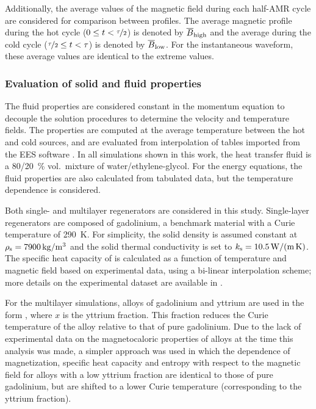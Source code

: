 \documentclass[referee]{svjour3}
\begin{document}

Additionally, the average values of the magnetic field during each half-AMR cycle are considered for comparison between profiles. The average magnetic profile during the hot cycle ($0 \le t < \nicefrac{\tau}{2}$) is denoted by $\overline{B}_{\mathrm{high}}$ and the average during the cold cycle  ($ \nicefrac{\tau}{2} \le t < \tau$) is denoted by $\overline{B}_{\mathrm{low}}$. For the instantaneous waveform, these average values are identical to the extreme values.


\subsubsection{Evaluation of solid and fluid properties}
\label{sec:eval-solid-fluid}

The fluid properties are considered constant in the momentum equation to decouple the solution procedures to determine the velocity and temperature fields. The properties are computed at the average temperature between the hot and cold sources, and are evaluated from interpolation of tables imported from the EES software \cite{bib:klein13-ees}. In all simulations shown in this work, the heat transfer fluid is a \num{80}/\SI{20}{\percent} vol.~mixture of water/ethylene-glycol. For the energy equations, the fluid properties are also calculated from tabulated data, but the temperature dependence is considered.


Both single- and multilayer regenerators are considered in this study. Single-layer regenerators are composed of gadolinium,  a benchmark material with a Curie temperature of \SI{290}{\kelvin}. For simplicity, the solid density is assumed constant at $\rho\ped{s} = \SI{7900}{\kg\per\cubic\meter}$ and the solid thermal conductivity is set to $k_{\mathrm{s}} = \SI{10.5}{\watt\per\meter\per\kelvin}$. The specific heat capacity of  is calculated as a function of temperature and magnetic field based on experimental data, using a bi-linear interpolation scheme; more details on the experimental dataset are available in \cite{bib:trevizoli16_perfor_model}. 

For the multilayer simulations, alloys of gadolinium and yttrium are used in the form , where $x$ is the yttrium fraction.  This fraction reduces the Curie temperature of the alloy relative to that of pure gadolinium. Due to the lack of experimental  data on the magnetocaloric properties of  alloys at the time this analysis was made, a simpler approach was used in which the dependence of magnetization, specific heat capacity and entropy with respect to the magnetic field for alloys with a low yttrium fraction are identical to those of pure gadolinium, but are shifted to a lower Curie temperature (corresponding to the yttrium fraction). 
\end{document}
